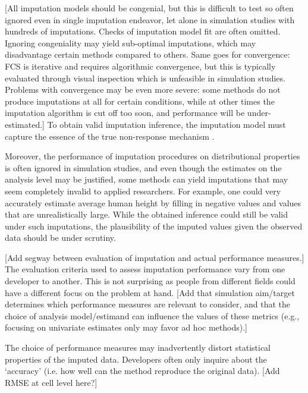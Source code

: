 \documentclass[bimj,fleqn]{w-art}
\begin{document}
[All imputation models should be congenial, but this is difficult to test so often ignored even in single imputation endeavor, let alone in simulation studies with hundreds of imputations. Checks of imputation model fit are often omitted. Ignoring congeniality may yield sub-optimal imputations, which may disadvantage certain methods compared to others. Same goes for convergence: FCS is iterative and requires algorithmic convergence, but this is typically evaluated through visual inspection which is unfeasible in simulation studies. Problems with convergence may be even more severe: some methods do not produce imputations at all for certain conditions, while at other times the imputation algorithm is cut off too soon, and performance will be under-estimated.] To obtain valid imputation inference, the imputation model must capture the essence of the true non-response mechanism \citep{meng94}. %

Moreover, the performance of imputation procedures on distributional properties is often ignored in simulation studies, and even though the estimates on the analysis level may be justified, some methods can yield imputations that may seem completely invalid to applied researchers. For example, one could very accurately estimate average human height by filling in negative values and values that are unrealistically large. While the obtained inference could still be valid under such imputations, the plausibility of the imputed values given the observed data should be under scrutiny. 

[Add segway between evaluation of imputation and actual performance measures.]
The evaluation criteria used to assess imputation performance vary from one developer to another. This is not surprising as people from different fields could have a different focus on the problem at hand. [Add that simulation aim/target determines which performance measures are relevant to consider, and that the choice of analysis model/estimand can influence the values of these metrics (e.g., focusing on univariate estimates only may favor ad hoc methods).]

The choice of performance measures may inadvertently distort statistical properties of the imputed data. Developers often only inquire about the `accuracy' (i.e. how well can the method reproduce the original data). [Add RMSE at cell level here?] 
\end{document}
